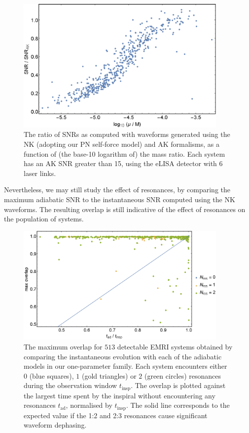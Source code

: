 \begin{figure}[htbp]
\centering
\includegraphics[width=0.92\textwidth]{pop_SNR_vs_eta}
\caption{\label{fig:pop-SNR-vs-eta}The ratio of SNRs as computed with waveforms generated using the NK (adopting our PN self-force model) and AK formalisms, as a function of (the base-10 logarithm of) the mass ratio. Each system has an AK SNR greater than 15, using the eLISA detector with 6 laser links.}
\end{figure}

Nevertheless, we may still study the effect of resonances, by comparing the maximum adiabatic SNR to the instantaneous SNR computed using the NK waveforms. The resulting overlap is still indicative of the effect of resonances on the population of systems.

\begin{figure}[htbp]
\centering
\includegraphics[width=0.92\textwidth]{pop_adSNR_vs_Tad}
\caption{\label{fig:pop-adSNR-vs-Tad}The maximum overlap for $513$ detectable EMRI systems obtained by comparing the instantaneous evolution with each of the adiabatic models in our one-parameter family. Each system encounters either $0$ (blue squares), $1$ (gold triangles) or $2$ (green circles) resonances during the observation window $t_\mathrm{insp}$. The overlap is plotted against the largest time spent by the inspiral without encountering any resonances $t_\mathrm{ad}$, normalised by $t_\mathrm{insp}$. The solid line corresponds to the expected value if the 1:2 and 2:3 resonances cause significant waveform dephasing.}
\end{figure}


